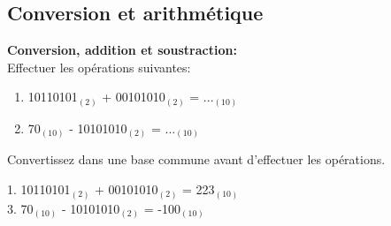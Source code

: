 \subsection{Conversion et arithmétique}
\begin{Exercice}[5 minutes] \textbf{Conversion, addition et soustraction:}\\
    Effectuer les opérations suivantes:
    \begin{enumerate}
        \item 10110101$_{(2)}$ + 00101010$_{(2)}$ = ...$_{(10)}$
        \item 70$_{(10)}$ - 10101010$_{(2)}$ = ...$_{(10)}$
    \end{enumerate}
        \begin{conseil}
        Convertissez dans une base commune avant d'effectuer les opérations.
    \end{conseil}
        
    \begin{solution}
        1. 10110101$_{(2)}$ + 00101010$_{(2)}$ = 223$_{(10)}$\\
        3. 70$_{(10)}$ - 10101010$_{(2)}$ = -100$_{(10)}$
    \end{solution}
\end{Exercice}


